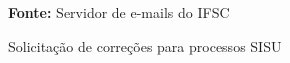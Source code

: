 \begin{figure}[h!]
\centering

\caption{\textmd{Solicitação de correções para processos SISU}}
\label{fig:seres}

\par\medskip\textbf{Fonte:} Servidor de e-mails do IFSC \par\medskip

\end{figure}

